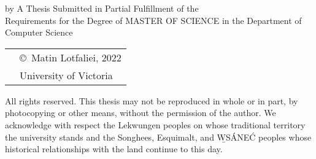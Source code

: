\pagebreak
{
\centering
\thesistitle
\tpbreak
by
\tpbreak
\nameanddegrees
\tpbreak
A Thesis Submitted in Partial Fulfillment of the \\
Requirements for the Degree of
\tpbreak
MASTER OF SCIENCE
\tpbreak
in the Department of Computer Science\\
\vfill
\begin{tabular}{cl}
& \copyright\ Matin Lotfaliei, 2022\\
& \phantom{\copyright} University of Victoria
\end{tabular}
\tpbreak
All rights reserved. This thesis may not be reproduced in whole or in part, by photocopying or other means, without the permission of the author. 
\tpbreak
We acknowledge with respect the Lekwungen peoples on whose traditional territory the university stands and the Songhees, Esquimalt, and \b{W}S\'{A}NE\'{C} peoples whose historical relationships with the land continue to this day. \\
}
\pagebreak
